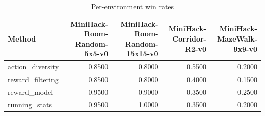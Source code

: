 \begin{table}[htbp]
\centering
\caption{Per-environment win rates}
\label{tab:per-env}
\begin{tabular}{lrrrr}
\toprule
\textbf{Method} & \textbf{MiniHack-Room-Random-5x5-v0} & \textbf{MiniHack-Room-Random-15x15-v0} & \textbf{MiniHack-Corridor-R2-v0} & \textbf{MiniHack-MazeWalk-9x9-v0} \\
\midrule
action\_diversity & 0.8500 & 0.8000 & 0.5500 & 0.2000 \\
reward\_filtering & 0.8500 & 0.8000 & 0.4000 & 0.1500 \\
reward\_model & 0.9500 & 0.9000 & 0.3500 & 0.2500 \\
running\_stats & 0.9500 & 1.0000 & 0.3500 & 0.2000 \\
\bottomrule
\end{tabular}
\end{table}